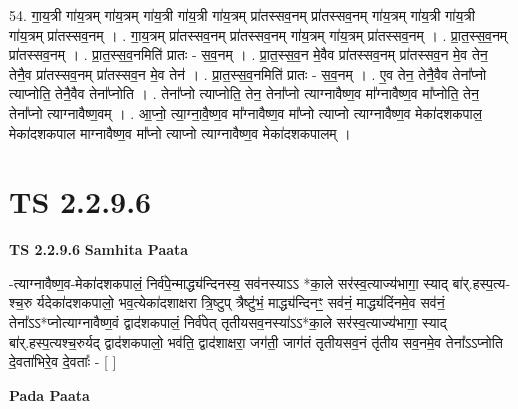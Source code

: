 \documentclass[17pt]{extarticle}
\begin{document}
54. गा॒य॒त्री गा॑य॒त्रम् गा॑य॒त्रम् गा॑य॒त्री गा॑य॒त्री गा॑य॒त्रम् प्रा॑तस्सव॒नम् प्रा॑तस्सव॒नम् गा॑य॒त्रम् गा॑य॒त्री गा॑य॒त्री गा॑य॒त्रम् प्रा॑तस्सव॒नम् । . गा॒य॒त्रम् प्रा॑तस्सव॒नम् प्रा॑तस्सव॒नम् गा॑य॒त्रम् गा॑य॒त्रम् प्रा॑तस्सव॒नम् । . प्रा॒त॒स्स॒व॒नम् प्रा॑तस्सव॒नम् । . प्रा॒त॒स्स॒व॒नमिति॑ प्रातः - स॒व॒नम् । . प्रा॒त॒स्स॒व॒न मे॒वैव प्रा॑तस्सव॒नम् प्रा॑तस्सव॒न मे॒व तेन॒ तेनै॒व प्रा॑तस्सव॒नम् प्रा॑तस्सव॒न मे॒व तेन॑ । . प्रा॒त॒स्स॒व॒नमिति॑ प्रातः - स॒व॒नम् । . ए॒व तेन॒ तेनै॒वैव तेना᳚प्नो त्याप्नोति॒ तेनै॒वैव तेना᳚प्नोति । . तेना᳚प्नो त्याप्नोति॒ तेन॒ तेना᳚प्नो त्याग्नावैष्ण॒व मा᳚ग्नावैष्ण॒व मा᳚प्नोति॒ तेन॒ तेना᳚प्नो त्याग्नावैष्ण॒वम् । . आ॒प्नो॒ त्या॒ग्ना॒वै॒ष्ण॒व मा᳚ग्नावैष्ण॒व मा᳚प्नो त्याप्नो त्याग्नावैष्ण॒व मेका॑दशकपाल॒ मेका॑दशकपाल माग्नावैष्ण॒व मा᳚प्नो त्याप्नो त्याग्नावैष्ण॒व मेका॑दशकपालम् । \newline
\pagebreak
{}
\section*{ TS 2.2.9.6 }

\textbf{TS 2.2.9.6 } \newline
\textbf{Samhita Paata} \newline

-त्याग्नावैष्ण॒व-मेका॑दशकपालं॒ निर्व॑पे॒न्माद्ध्य॑न्दिनस्य॒ सव॑नस्याऽऽ *का॒ले सर॑स्व॒त्याज्य॑भागा॒ स्याद् बा॑र्.हस्प॒त्य-श्च॒रु र्यदेका॑दशकपालो॒ भव॒त्येका॑दशाक्षरा त्रि॒ष्टुप् त्रैष्टु॑भं॒ माद्ध्य॑न्दिनꣳ॒॒ सव॑नं॒ माद्ध्य॑दिंनमे॒व सव॑नं॒ तेना᳚ऽऽ*प्नोत्याग्नावैष्ण॒वं द्वाद॑शकपालं॒ निर्व॑पेत् तृतीयसव॒नस्या॑ऽऽ*का॒ले सर॑स्व॒त्याज्य॑भागा॒ स्याद् बा॑र्.हस्प॒त्यश्च॒रुर्यद् द्वाद॑शकपालो॒ भव॑ति॒ द्वाद॑शाक्षरा॒ जग॑ती॒ जाग॑तं तृतीयसव॒नं तृ॑तीय सव॒नमे॒व तेना᳚ऽऽप्नोति दे॒वता॑भिरे॒व दे॒वताः᳚ - [  ] \newline

\textbf{Pada Paata} \newline
\end{document}
